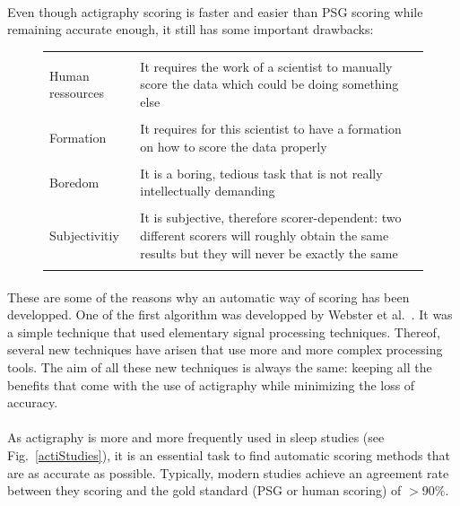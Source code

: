 \documentclass[a4paper,12pt]{article}
\begin{document}
\paragraph{}
Even though actigraphy scoring is faster and easier than PSG scoring while remaining accurate enough, it still has some important drawbacks:

\begin{figure}[H]
\centering
\begin{tabularx}{\textwidth}{|X|X|}
\hline
& \\
Human ressources & It requires the work of a scientist to manually score the data which could be doing something else \\
& \\
Formation & It requires for this scientist to have a formation on how to score the data properly \\
& \\
Boredom & It is a boring, tedious task that is not really intellectually demanding \\
& \\
Subjectivitiy & It is subjective, therefore scorer-dependent: two different scorers will roughly obtain the same results but they will never be exactly the same \\
& \\
\hline
\end{tabularx}
\end{figure}

\paragraph{}
These are some of the reasons why an automatic way of scoring has been developped. One of the first algorithm was developped by Webster et al.~\cite{Webster1982}. It was a simple technique that used elementary signal processing techniques. Thereof, several new techniques have arisen that use more and more complex processing tools. The aim of all these new techniques is always the same: keeping all the benefits that come with the use of actigraphy while minimizing the loss of accuracy.

\paragraph{}
As actigraphy is more and more frequently used in sleep studies (see Fig.~\ref{actiStudies}), it is an essential task to find automatic scoring methods that are as accurate as possible. Typically, modern studies achieve an agreement rate between they scoring and the gold standard (PSG or human scoring) of $>90\%$\cite{Pires2009}\cite{Crespo2012}.
\end{document}
